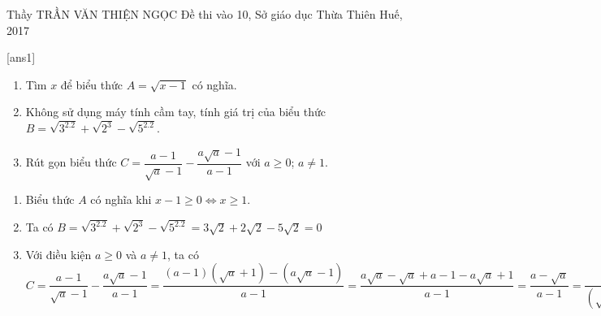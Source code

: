 \begin{name}
{Thầy  TRẦN VĂN THIỆN NGỌC}
{Đề thi vào 10, Sở giáo dục Thừa Thiên Huế, 2017}
\end{name}
\setcounter{ex}{0}
[ans1]

\begin{ex}%
    \hfill
    \begin{enumerate}
        \item Tìm $x$ để biểu thức $A=\sqrt{x-1}$ có nghĩa.
        \item Không sử dụng máy tính cầm tay, tính giá trị của biểu thức $B=\sqrt{3^2.2}+\sqrt{2^3}-\sqrt{5^2.2}$.
        \item Rút gọn biểu thức $C=\dfrac{a-1}{\sqrt{a}-1}-\dfrac{a\sqrt{a}-1}{a-1}$ với $a \geq 0$; $a\neq 1$.
    \end{enumerate}
\loigiai
    {
    \begin{enumerate}
        \item Biểu thức $A$ có nghĩa khi $x-1 \geq 0 \Leftrightarrow x\geq 1$.
        \item Ta có $B=\sqrt{3^2.2}+\sqrt{2^3}-\sqrt{5^2.2}=3\sqrt{2}+2\sqrt{2}-5\sqrt{2}=0$
        \item Với điều kiện $a \geq 0$ và $a\neq 1$, ta có $C=\dfrac{a-1}{\sqrt{a}-1}-\dfrac{a\sqrt{a}-1}{a-1}=\dfrac{(a-1)(\sqrt{a}+1)-(a\sqrt{a}-1)}{a-1}=\dfrac{a\sqrt{a}-\sqrt{a}+a-1-a\sqrt{a}+1}{a-1}=\dfrac{a-\sqrt{a}}{a-1}=\dfrac{\sqrt{a}(\sqrt{a}-1)}{(\sqrt{a}-1)(\sqrt{a}+1)}=\dfrac{\sqrt{a}}{\sqrt{a}+1}$
    \end{enumerate}
    }
\end{ex}



